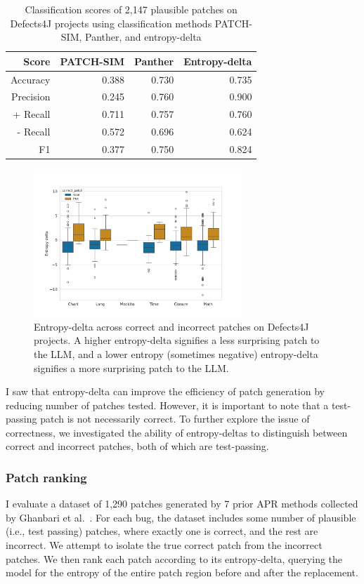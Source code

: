 \documentclass[12pt,openany,oneside,table]{cmuthesis}
\begin{document}
\begin{table}[t]
  \centering
\caption{\small Classification scores of 2,147 plausible patches on Defects4J projects using classification methods PATCH-SIM, Panther, and entropy-delta}
\begin{tabular}{r|rrr}
\toprule
\textbf{Score}  & \textbf{PATCH-SIM}& \textbf{Panther} & \textbf{Entropy-delta}
\\
\midrule
Accuracy  & 0.388 &  0.730 & 0.735\\
Precision  & 0.245 &  0.760 &0.900\\
+ Recall & 0.711 & 0.757 &0.760\\
- Recall & 0.572 &  0.696 &0.624\\
F1  & 0.377 &  0.750 & 0.824\\
\bottomrule
\end{tabular}
\label{table:patch_classification}
\end{table}

\begin{figure}
\centering
\includegraphics[width=0.7\textwidth]{figures/results/tested_ranking_edelta.pdf}
\caption{Entropy-delta across correct and incorrect patches on Defects4J projects. A
higher entropy-delta signifies a less surprising patch to the LLM, and a lower
entropy (sometimes negative) entropy-delta signifies a more surprising patch to
the LLM.}
\label{fig:e-delta-patch}
\end{figure}

I saw that entropy-delta can improve the efficiency of patch
generation by reducing number of patches tested. However, it is important to
note that a test-passing patch is not necessarily correct. To further explore
the issue of correctness, we investigated the ability of entropy-deltas to
distinguish between correct and incorrect patches, both of which are
test-passing.

\subsubsection{Patch ranking}
I evaluate a dataset of 1,290 patches generated by 7 prior APR methods
collected by Ghanbari et al.~\cite{Shibboleth}. For each bug, the dataset
includes some number of plausible (i.e., test passing) patches, where exactly
one is correct, and the rest are incorrect. We attempt to isolate the true
correct patch from the incorrect patches. We then rank each patch according to
its entropy-delta, querying the model for the entropy of the entire patch region
before and after the replacement. 
\end{document}
